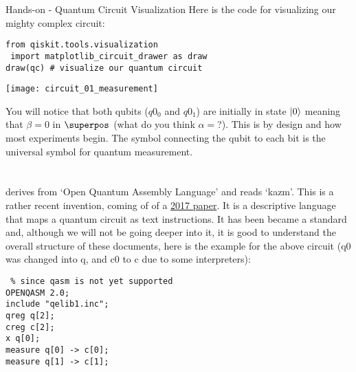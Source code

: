 \documentclass[aspectratio=43]{beamer}
\begin{document}
\begin{frame}[fragile]{Hands-on - Quantum Circuit Visualization}
Here is the code for visualizing our mighty complex circuit:
\begin{cardTiny}
\begin{verbatim}
from qiskit.tools.visualization 
 import matplotlib_circuit_drawer as draw
draw(qc) # visualize our quantum circuit
\end{verbatim}
\end{cardTiny}
\begin{center}
    \texttt{[image: circuit\_01\_measurement]}
\end{center}
\small{
    You will notice that both qubits ($q0_0$ and $q0_1$) are initially in state $\ket{0}$ meaning that $\beta=0$ in $\superpos$ (what do you think $\alpha=$?). This is by design and how most experiments begin. The symbol connecting the qubit to each bit is the universal symbol for quantum measurement.
}
\end{frame}

\section{\qasm}
\begin{frame}[fragile]{\qasm}
    \begin{cardTiny}
    \small{
    \qasm derives from `Open Quantum Assembly Language' and reads `kazm'. This is a rather recent invention, coming of of a \href{https://arxiv.org/abs/1707.03429}{2017 paper}. It is a descriptive language that maps a quantum circuit as text instructions. It has been became a standard and, although we will not be going deeper into it, it is good to understand the overall structure of these documents, here is the example for the above circuit (q0 was changed into q, and c0 to c due to some \qasm interpreters):
    }
    \end{cardTiny}
    \begin{cardTiny}
    \begin{verbatim} % since qasm is not yet supported
OPENQASM 2.0;
include "qelib1.inc";
qreg q[2];
creg c[2];
x q[0];
measure q[0] -> c[0];
measure q[1] -> c[1];
    \end{verbatim}
    \end{cardTiny}
\end{frame}
\end{document}
